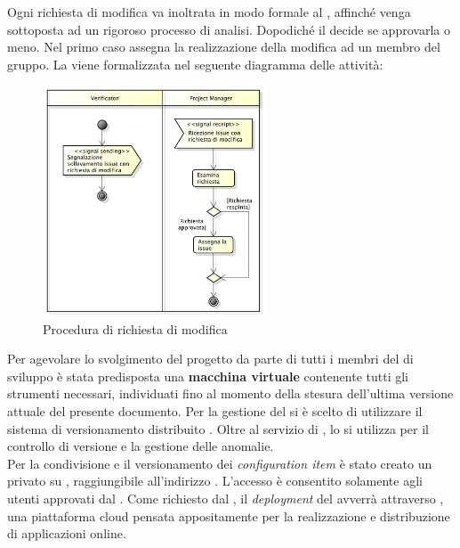 			\label{sec:StrutturaIssue}
				Ogni richiesta di modifica va inoltrata in modo formale al , affinché venga sottoposta ad un rigoroso processo di analisi. Dopodiché il  decide se approvarla o meno. Nel primo caso assegna la realizzazione della modifica ad un membro del gruppo. 
				La  viene formalizzata nel seguente diagramma delle attività:
				\begin{figure}[H]
					\centering
					\includegraphics[width=0.6\textwidth]{NormeDiProgetto/Pics/RichiestaModifica}
					\caption{Procedura di richiesta di modifica}
				\end{figure}
						
		Per agevolare lo svolgimento del progetto da parte di tutti i membri del  di sviluppo è stata predisposta una \textbf{macchina virtuale} contenente tutti gli strumenti  necessari, individuati fino al momento della stesura dell'ultima versione attuale del presente documento.
			Per la gestione del  si è scelto di utilizzare il sistema di versionamento distribuito . Oltre al servizio di , lo si utilizza per il controllo di versione e la gestione delle anomalie. \\
			Per la condivisione e il versionamento dei \textit{configuration item} è stato creato un  privato su , raggiungibile all’indirizzo . L’accesso è consentito solamente agli utenti approvati dal .
			Come richiesto dal , il \textit{deployment} del  avverrà attraverso , una piattaforma cloud pensata appositamente per la realizzazione e distribuzione di applicazioni online.